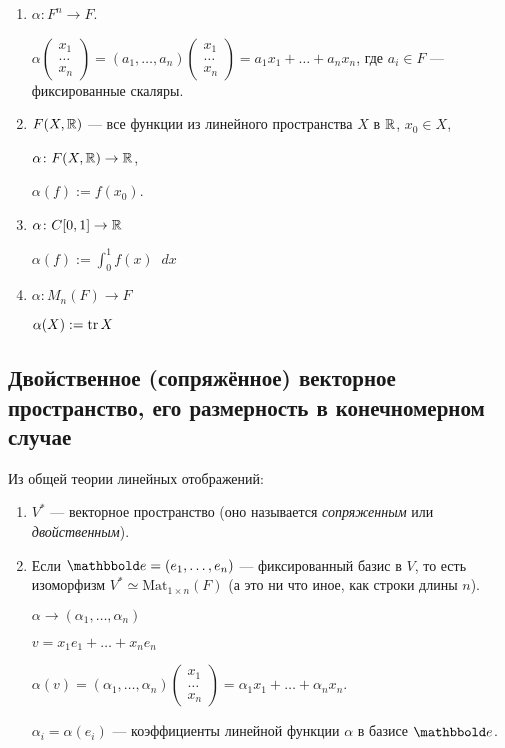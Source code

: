 \begin{enumerate}
\item $\alpha \colon F^n \to F$.

    $\alpha \begin{pmatrix} x_1 \\ \dots \\ x_n \end{pmatrix} = (a_1, \dots, a_n) \begin{pmatrix} x_1 \\ \dots \\ x_n \end{pmatrix} = a_1 x_1 + \dots + a_n x_n$, где $a_i \in F$ --- фиксированные скаляры.

\item $F(X, \mathbb{R})$ --- все функции из линейного пространства $X$ в $\mathbb{R}$, $x_0 \in X$,

    $\alpha \colon F(X, \mathbb{R}) \to \mathbb{R}$,

    $\alpha(f) := f(x_0)$.

\item $\alpha \colon C[0, 1] \to \mathbb{R}$

    $\alpha(f) := \displaystyle\int_0^1 f(x) \mathop{}\!d x$

\item $\alpha \colon M_n(F) \to F$

    $\alpha(X) := \operatorname{\mathop{\mathrm{tr}}} X$
\end{enumerate}

\subsection{Двойственное (сопряжённое) векторное пространство, его размерность в конечномерном случае}

Из общей теории линейных отображений:
\begin{enumerate}
\item $V^{*}$ --- векторное пространство (оно называется \textit{сопряженным} или \textit{двойственным}).
\item Если $\E = (e_1, \dots, e_n)$ --- фиксированный базис в $V$, то есть изоморфизм $V^{*} \simeq \text{Mat}_{1 \times n}(F)$ (а это ни что иное, как строки длины $n$).

    $\alpha \to (\alpha_1, \dots, \alpha_n)$

    $v = x_1 e_1 + \dots + x_n e_n$

    $\alpha(v) = (\alpha_1, \dots, \alpha_n) \begin{pmatrix} x_1 \\ \dots \\ x_n \end{pmatrix} = \alpha_1 x_1 + \dots + \alpha_n x_n$.

    $\alpha_i = \alpha(e_i)$ --- коэффициенты линейной функции $\alpha$ в базисе $\E$.
\end{enumerate}

